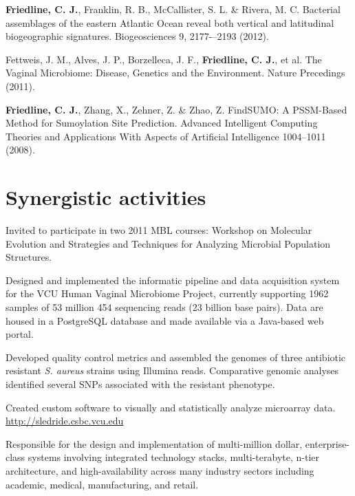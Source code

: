 \begin{packed_item}	
	\item{\textbf{Friedline, C. J.}, Franklin, R. B., McCallister, S. L. \& Rivera, M. C. Bacterial assemblages of the 
	eastern Atlantic Ocean reveal both vertical and latitudinal biogeographic signatures. 
	Biogeosciences 9, 2177-–2193 (2012).}
	
	\item{Fettweis, J. M., Alves, J. P., Borzelleca, J. F., \textbf{Friedline, C. J.}, et al. The Vaginal Microbiome: 
	Disease, Genetics and the Environment. Nature Precedings (2011).}
	
	\item{\textbf{Friedline, C. J.}, Zhang, X., Zehner, Z. \& Zhao, Z. FindSUMO: A PSSM-Based Method for 
	Sumoylation Site Prediction. Advanced Intelligent Computing Theories and Applications With Aspects 
	of Artificial Intelligence 1004--1011 (2008).}
\end{packed_item}

\section{Synergistic activities}
\begin{packed_item}
	\item{Invited to participate in two 2011 MBL courses: Workshop on Molecular Evolution and Strategies 
	and Techniques for Analyzing Microbial Population Structures}.
	\item{Designed and implemented the informatic pipeline and data acquisition system for the VCU Human Vaginal Microbiome 
	Project, currently supporting \num{1962} samples of 53 million 454 sequencing reads (23 billion base pairs).  Data 
	are housed in a PostgreSQL database and made available via a Java-based web portal.}
	\item{Developed quality control metrics and assembled the genomes of three antibiotic resistant \textit{S. aureus} 
	strains using Illumina reads.  Comparative genomic analyses identified several SNPs associated with the resistant phenotype.}
	\item{Created custom software to visually and statistically analyze microarray data.\\
	 \url{http://sledride.csbc.vcu.edu}}
	\item{Responsible for the design and implementation of multi-million dollar, enterprise-class systems involving 
	integrated technology stacks, multi-terabyte, n-tier architecture, and high-availability across many industry 
	sectors including academic, medical, manufacturing, and retail.}
\end{packed_item}

